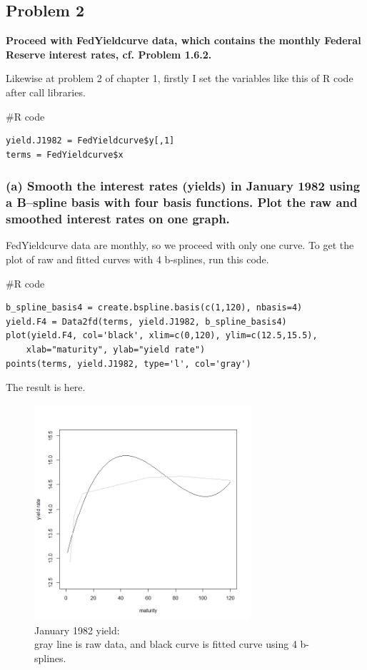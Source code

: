 \documentclass{article}
\newenvironment{Rcode}%
{%
    \begin{mdframed}
    \#R code
    \begin{small}
}
{%
    \end{small}
    \end{mdframed}
}
\begin{document}
\newpage
\subsection{Problem 2}
\textbf{
Proceed with FedYieldcurve data, which contains the monthly Federal Reserve interest rates, cf. Problem 1.6.2.
}

Likewise at problem 2 of chapter 1, firstly I set the variables like this of R code after call libraries.
\begin{Rcode}
    \begin{verbatim}
yield.J1982 = FedYieldcurve$y[,1]
terms = FedYieldcurve$x
    \end{verbatim}
\end{Rcode}


\subsubsection*{(a) Smooth the interest rates (yields) in January 1982 using a B–spline basis 
with four basis functions. Plot the raw and smoothed interest rates on one graph.}

FedYieldcurve data are monthly, so we proceed with only one curve.
To get the plot of raw and fitted curves with 4 b-splines, run this code.
\begin{Rcode}
    \begin{verbatim}
b_spline_basis4 = create.bspline.basis(c(1,120), nbasis=4)
yield.F4 = Data2fd(terms, yield.J1982, b_spline_basis4)
plot(yield.F4, col='black', xlim=c(0,120), ylim=c(12.5,15.5), 
    xlab="maturity", ylab="yield rate")
points(terms, yield.J1982, type='l', col='gray')
    \end{verbatim}
\end{Rcode}
The result is here.
\begin{figure}[hh]
    \centering
    \includegraphics[height=8cm]{1982Jyield_raw_bspline4.png}
    \caption{January 1982 yield:\\ gray line is raw data, and black curve is fitted curve using 4 b-splines.}
\end{figure}
\end{document}
